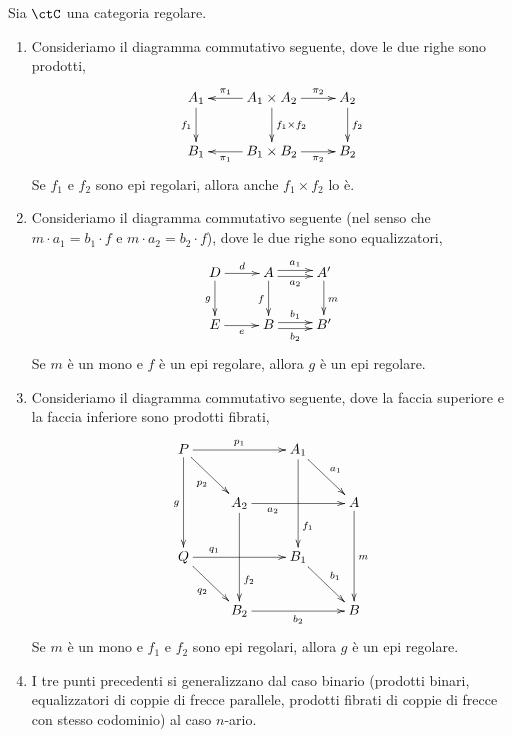 \begin{exercise}\label{esercizio_stab_epireg}
 Sia \(\ctC\) una categoria regolare.
 \begin{enumerate}
  \item Consideriamo il diagramma commutativo seguente, dove le due righe sono prodotti,
        \[\xymatrix{A_1 \ar[d]_{f_1} & A_1 \times A_2 \ar[l]_-{\pi_1} \ar[d]^{f_1 \times f_2} \ar[r]^-{\pi_2} & A_2 \ar[d]^{f_2} \\
         B_1 & B_1 \times B_2 \ar[l]^-{\pi_1} \ar[r]_-{\pi_2} & B_2}\]
        Se \(f_1\) e \(f_2\) sono epi regolari, allora anche \(f_1 \times f_2\) lo è.
  \item Consideriamo il diagramma commutativo seguente (nel senso che \(m \cdot a_1 = b_1 \cdot f\)
        e \(m \cdot a_2 = b_2 \cdot f\)), dove le due righe sono equalizzatori,
        \[\xymatrix{D \ar[r]^-{d} \ar[d]_{g} & A \ar@<0.5ex>[r]^-{a_1} \ar@<-0.5ex>[r]_-{a_2} \ar[d]_{f} & A' \ar[d]^{m} \\
         E \ar[r]_-{e} & B \ar@<0.5ex>[r]^-{b_1} \ar@<-0.5ex>[r]_-{b_2} & B'}\]
        Se \(m\) è un mono e \(f\) è un epi regolare, allora \(g\) è un epi regolare.
  \item Consideriamo il diagramma commutativo seguente, dove la faccia superiore e la faccia inferiore
        sono prodotti fibrati,
        \[\xymatrix{P \ar[rr]^-{p_1} \ar[rd]_{p_2} \ar[dd]_{g} & & A_1 \ar[rd]^{a_1} \ar[dd]^>>>>>>{f_1} \\
         & A_2 \ar[rr]_<<<<<<{a_2} \ar[dd]^>>>>>>{f_2} & & A \ar[dd]^{m} \\
         Q \ar[rr]^<<<<<<{q_1} \ar[rd]_{q_2} & & B_1 \ar[rd]^{b_1} \\
         & B_2 \ar[rr]_-{b_2} & & B}\]
        Se \(m\) è un mono e \(f_1\) e \(f_2\) sono epi regolari, allora \(g\) è un epi regolare.
  \item I tre punti precedenti si generalizzano dal caso binario (prodotti binari, equalizzatori di coppie di frecce parallele,
        prodotti fibrati di coppie di frecce con stesso codominio) al caso \(n\)-ario.
 \end{enumerate}
\end{exercise}

